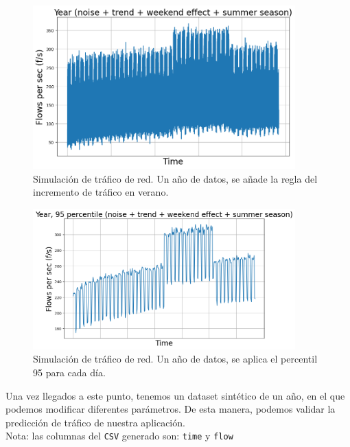 \documentclass[a4paper, oneside, 12pt]{book}
\begin{document}
\begin{enumerate}
		\begin{figure}[h!]
			\includegraphics[width=0.9\textwidth, center]{img/anexo_6.png}
			\caption{Simulación de tráfico de red. Un año de datos, se añade la regla del incremento de tráfico en verano.}
			\label{img: anexo 6}
		\end{figure}
	
		\pagebreak
	
		\begin{figure}[h!]
			\includegraphics[width=0.9\textwidth, center]{img/anexo_7.png}
			\caption{Simulación de tráfico de red. Un año de datos, se aplica el percentil 95 para cada día.}
			\label{img: anexo 7}
		\end{figure}
	
		\noindent Una vez llegados a este punto, tenemos un dataset sintético de un año, en el que podemos modificar diferentes parámetros. De esta manera, podemos validar la predicción de tráfico de nuestra aplicación. \\
		
		\noindent Nota: las columnas del \texttt{CSV} generado son: \texttt{time} y \texttt{flow}
		
	\end{enumerate}
	
\end{document}
